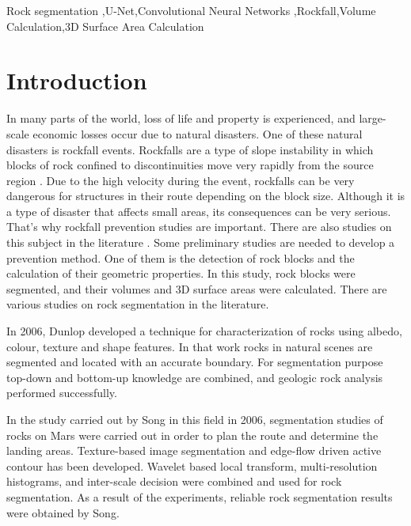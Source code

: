 \documentclass[a4paper,fleqn]{cas-sc}
\begin{document}
\begin{keywords}
Rock segmentation \sep U-Net\sep Convolutional Neural Networks \sep Rockfall\sep Volume Calculation\sep 3D Surface Area Calculation
\end{keywords}

\maketitle 

\printcredits

\doublespacing


\section{Introduction}
\label{intro}
In many parts of the world, loss of life and property is experienced, and large-scale economic losses occur due to natural disasters. One of these natural disasters is rockfall events. Rockfalls are a type of slope instability in which blocks of rock confined to discontinuities move very rapidly from the source region \citep{varnes1978slope, hutchinson1988morphological, CrudenVarnes1996}. Due to the high velocity during the event, rockfalls can be very dangerous for structures in their route depending on the block size. Although it is a type of disaster that affects small areas, its consequences can be very serious. That's why rockfall prevention studies are important. There are also studies on this subject in the literature \citep{liu2021trajectory, keskin2022kinematic,ji2023assessment,kainthola2023stability, cao2024risk}. Some preliminary studies are needed to develop a prevention method. One of them is the detection of rock blocks and the calculation of their geometric properties. In this study, rock blocks were segmented, and their volumes and 3D surface areas were calculated. There are various studies on rock segmentation in the literature.

In 2006, Dunlop \citep{dunlop2006automatic} developed a technique for characterization of rocks using albedo, colour, texture and shape features. In that work rocks in natural scenes are segmented and located with an accurate boundary. For segmentation purpose top-down and bottom-up knowledge are combined, and geologic rock analysis performed successfully.

In the study carried out by Song \citep{Song2006AFF} in this field in 2006, segmentation studies of rocks on Mars were carried out in order to plan the route and determine the landing areas. Texture-based image segmentation and edge-flow driven active contour has been developed. Wavelet based local transform, multi-resolution histograms, and inter-scale decision were combined and used for rock segmentation. As a result of the experiments, reliable rock segmentation results were obtained by Song.
\end{document}
